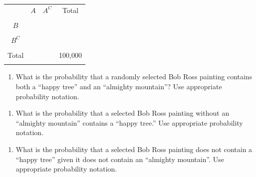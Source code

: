 \documentclass[
]{report}
\providecommand{\tightlist}{%
  \setlength{\itemsep}{0pt}\setlength{\parskip}{0pt}}
\begin{document}
\begin{center}
\begin{tabular}{|c|c|c|c|} \hline
\hspace{0.8in} & \hspace{0.35in} $A$ \hspace{.35in} & \hspace{0.35in} $A^C$  \hspace{0.35in} & \hspace{0.3in} Total \hspace{0.3in} \\
& & & \\ \hline
$B$& & & \\
& & & \\ \hline
$B^C$& & & \\
& & & \\ \hline
Total & & & 100,000 \\
& & & \\ \hline
\end{tabular}
\end{center}
\vspace{.1in}

\begin{enumerate}
\def\labelenumi{\alph{enumi}.}
\tightlist
\item
  What is the probability that a randomly selected Bob Ross painting contains both a ``happy tree'' and an ``almighty mountain''? Use appropriate probability notation.
\end{enumerate}

\vspace{0.5in}

\begin{enumerate}
\def\labelenumi{\alph{enumi}.}
\setcounter{enumi}{1}
\tightlist
\item
  What is the probability that a selected Bob Ross painting without an ``almighty mountain'' contains a ``happy tree.'' Use appropriate probability notation.
\end{enumerate}

\vspace{0.5in}

\begin{enumerate}
\def\labelenumi{\alph{enumi}.}
\setcounter{enumi}{2}
\tightlist
\item
  What is the probability that a selected Bob Ross painting does not contain a ``happy tree'' given it does not contain an ``almighty mountain''. Use appropriate probability notation.
\end{enumerate}
\end{document}
